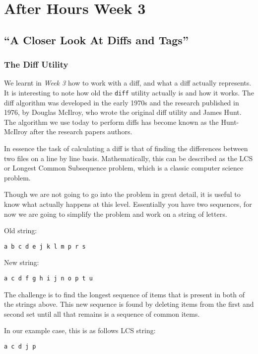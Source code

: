 \chapter{After Hours Week 3}
\section{``A Closer Look At Diffs and Tags''}
\subsection{The Diff Utility}

We learnt in \emph{Week 3} how to work with a diff, and what a diff actually represents.  It is interesting to note how old the \texttt{diff} utility actually is and how it works.  The diff algorithm was developed in the early 1970s and the research published in 1976, by Douglas McIlroy, who wrote the original diff utility and James Hunt.  The algorithm we use today to perform diffs has become known as the Hunt-McIlroy after the research papers authors.

In essence the task of calculating a diff is that of finding the differences between two files on a line by line basis.  Mathematically, this can be described as the LCS or Longest Common Subsequence problem, which is a classic computer science problem.  

Though we are not going to go into the problem in great detail, it is useful to know what actually happens at this level.  Essentially you have two sequences, for now we are going to simplify the problem and work on a string of letters.

Old string: 
\begin{Verbatim}
a b c d e j k l m p r s
\end{Verbatim}

New string: 
\begin{Verbatim}
a c d f g h i j n o p t u
\end{Verbatim}

The challenge is to find the longest sequence of items that is present in both of the strings above.  This new sequence is found by deleting items from the first and second set until all that remains is a sequence of common items.  

In our example case, this is as follows
LCS string: 
\begin{Verbatim}
a c d j p
\end{Verbatim}


